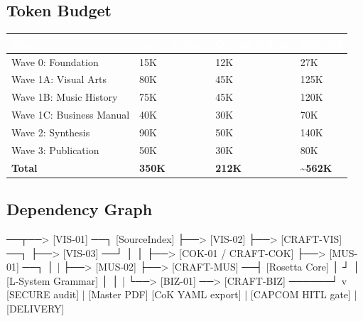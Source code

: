 \documentclass[11pt,letterpaper]{article}
\newcommand{\tableheader}[1]{\textbf{\sffamily\textcolor{white}{#1}}}
\begin{document}
\subsection{Token Budget}

\begin{tabularx}{\textwidth}{L{4cm}C{2.5cm}C{2.5cm}C{2.5cm}}
\toprule
{}
\tableheader{Wave} & \tableheader{Input Tokens} & \tableheader{Output Tokens} & \tableheader{Subtotal} \\
\midrule
Wave 0: Foundation & 15K & 12K & 27K \\
Wave 1A: Visual Arts & 80K & 45K & 125K \\
Wave 1B: Music History & 75K & 45K & 120K \\
Wave 1C: Business Manual & 40K & 30K & 70K \\
Wave 2: Synthesis & 90K & 50K & 140K \\
Wave 3: Publication & 50K & 30K & 80K \\
\midrule
\textbf{Total} & \textbf{350K} & \textbf{212K} & \textbf{\textasciitilde562K} \\
\bottomrule
\end{tabularx}

\subsection{Dependency Graph}

\begin{asciibox}
 ──┬──> [VIS-01] ──┐
[SourceIndex]   ├──> [VIS-02]   ├──> [CRAFT-VIS] ──┐
                ├──> [VIS-03] ──┘                   │
                │                                    ├──> [COK-01 / CRAFT-COK]
                ├──> [MUS-01] ──┐                   │         |
                ├──> [MUS-02]   ├──> [CRAFT-MUS] ──┤    [Rosetta Core]
                │               ┘                   │    [L-System Grammar]
                │                                   │         |
                └──> [BIZ-01] ──> [CRAFT-BIZ] ──────┘         v
                                                         [SECURE audit]
                                                              |
                                                         [Master PDF]
                                                         [CoK YAML export]
                                                              |
                                                      [CAPCOM HITL gate]
                                                              |
                                                        [DELIVERY]
\end{asciibox}
\end{document}
